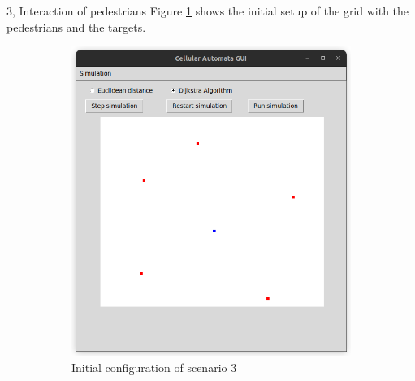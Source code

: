 \documentclass[10pt,a4paper]{article}
\begin{document}
\begin{task}{3, Interaction of pedestrians}
Figure \ref{fig:scenario3_initial} shows the initial setup of the grid with the pedestrians and the targets. \\
\begin{figure}
 \centering
 \begin{subfigure}[t]{0.4\textwidth}
    \centering
     \includegraphics[width=\textwidth]{images/scenario3_intial.png}
     \caption{Initial configuration of scenario 3 \\ }
     \label{fig:scenario3_initial}
 \end{subfigure}
 \begin{subfigure}[t]{0.4\textwidth}
     \centering

\end{subfigure}
\end{figure}
\end{task}
\end{document}
